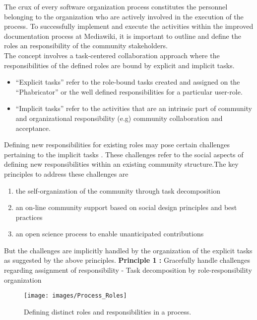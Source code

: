 \indent The crux of every software organization process constitutes the personnel belonging to the organization who are actively involved in the execution of the process. To successfully implement and execute the activities within the improved documentation process at Mediawiki, it is important to outline and define the roles an responsibility of the community stakeholders. 
\\\indent The concept involves a task-centered collaboration approach where the responsibilities of the defined roles are bound by explicit and implicit tasks. 
\begin{itemize}
\item \enquote{Explicit tasks} refer to the role-bound tasks created and assigned on the \enquote{Phabricator} or the well defined responsibilities for a particular user-role.
\item \enquote{Implicit tasks} refer to the activities that are an intrinsic part of community and organizational responsibility (e.g) community collaboration and acceptance.
\end{itemize}
Defining new responsibilities for existing roles may pose certain challenges pertaining to the implicit tasks . These challenges refer to the social aspects of defining new responsibilities within an existing community structure.The key principles to address these challenges are \cite{Michel_2014}
\begin{enumerate}
\item the self-organization of the community through task decomposition
\item an on-line community support based on social design principles and best practices
\item an open science process to enable unanticipated contributions
\end{enumerate}

But the challenges are implicitly handled by the organization of the explicit tasks as suggested by the above principles. 
\newline \newline
 \textbf{Principle 1 : }  Gracefully handle challenges regarding assignment of responsibility  - Task decomposition by role-responsibility organization
\begin{figure}[H]
  \centering
  \texttt{[image: images/Process\_Roles]}
  \caption[Defining distinct roles and responsibilities in a process]{Defining distinct roles and responsibilities in a process.}\label{fig:Process_Roles}
\end{figure}

